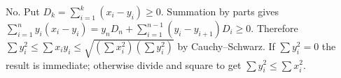 No. Put $D_k=\sum_{i=1}^k(x_i-y_i)\ge0$. Summation by parts gives $\sum_{i=1}^n y_i(x_i-y_i)=y_nD_n+\sum_{i=1}^{n-1}(y_i-y_{i+1})D_i\ge0$. Therefore $\sum y_i^2\le\sum x_iy_i\le\sqrt{(\sum x_i^2)(\sum y_i^2)}$ by Cauchy--Schwarz. If $\sum y_i^2=0$ the result is immediate; otherwise divide and square to get $\sum y_i^2\le\sum x_i^2$.
